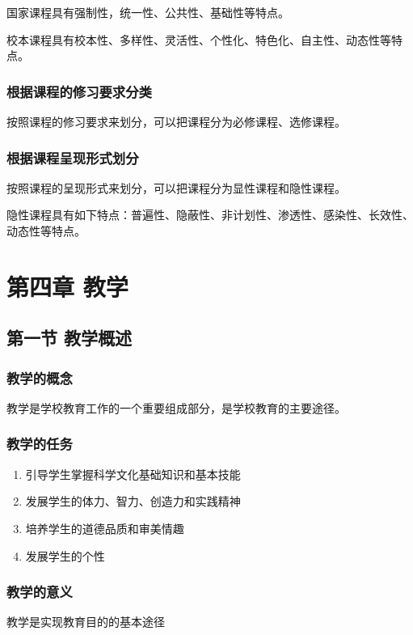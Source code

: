 \documentclass[b5paper,11pt]{article}
\begin{document}
国家课程具有\textcolor{ctp-red}{强制性，统一性、公共性、基础性}等特点。

校本课程具有\textcolor{ctp-red}{校本性、多样性、灵活性、个性化、特色化、自主性、动态性}等特点。

\subsubsection{根据课程的修习要求分类}
按照课程的修习要求来划分，可以把课程分为\textcolor{ctp-red}{必修课程、选修课程}。

\subsubsection{根据课程呈现形式划分}
按照课程的呈现形式来划分，可以把课程分为\textcolor{ctp-red}{显性课程和隐性课程}。

隐性课程具有如下特点：\textcolor{ctp-red}{普遍性、隐蔽性、非计划性、渗透性、感染性、长效性、动态性}等特点。

\section{第四章 教学}
\subsection{第一节 \space 教学概述}
\subsubsection{教学的概念}
\textcolor{ctp-red}{教学是学校教育工作的一个重要组成部分，是学校教育的主要途径。}

\subsubsection{教学的任务}
\textcolor{ctp-rosewater}{
  \begin{enumerate}
    \item 引导学生掌握科学文化基础知识和基本技能
    \item 发展学生的体力、智力、创造力和实践精神
    \item 培养学生的道德品质和审美情趣
    \item 发展学生的个性
  \end{enumerate}
}

\subsubsection{教学的意义}
\textcolor{ctp-red}{教学是实现教育目的的基本途径}
\end{document}
